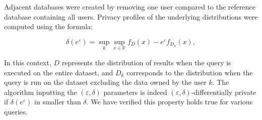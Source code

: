 \documentclass{article}
\begin{document}
    Adjacent databases were created by removing one user compared to the reference database containing all users. Privacy profiles of the underlying distributions were computed using the formula:
    
    \begin{equation}
        \delta(e^{\varepsilon}) = \sup_{k} \sup_{x\in\mathbb{R}} f_{D}(x) - e^{\varepsilon}f_{D_k}(x),
    \end{equation}
    
    In this context, $D$ represents the distribution of results when the query is executed on the entire dataset,
    and $D_k$ corresponds to the distribution when the query is run on the dataset excluding the data owned by the user $k$.
    The algorithm inputting the $(\varepsilon, \delta)$ parameters is indeed $(\varepsilon, \delta)$-differentially private if $\delta(e^{\varepsilon})$ in smaller than $\delta$.
    We have verified this property holds true for various queries.
    
    
\end{document}
